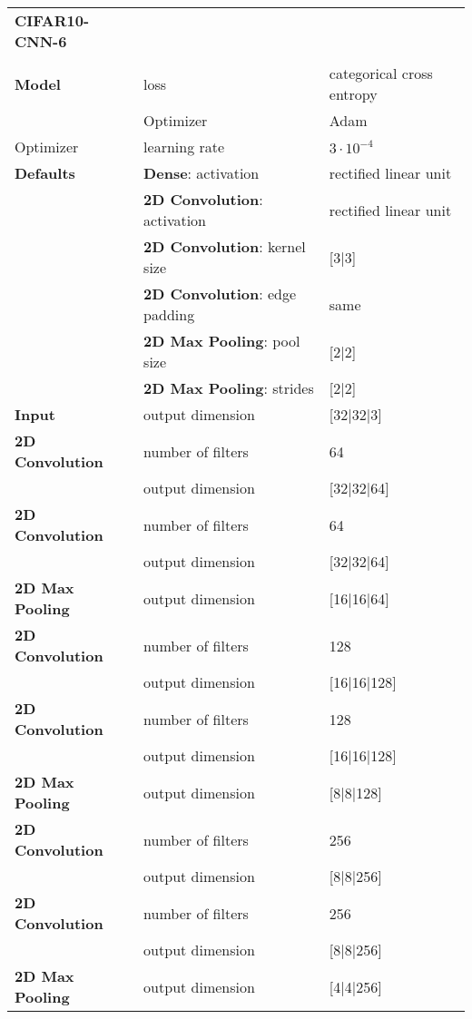 	\begin{tabularx}{\textwidth}[!h]{X X X}
		\multicolumn{1}{X}{\textbf{CIFAR10-CNN-6}}\\
		\\
		\hline
		\endhead
		\textbf{Model} & loss & categorical cross entropy\\
		& Optimizer & Adam\\
		Optimizer & learning rate & $3 \cdot 10^{-4}$\\
		\hline
		\textbf{Defaults} & \textbf{Dense}: activation & rectified linear unit\\
		& \textbf{2D Convolution}: activation & rectified linear unit\\
		& \textbf{2D Convolution}: kernel size & [3|3]\\
		& \textbf{2D Convolution}: edge padding & same\\
		& \textbf{2D Max Pooling}: pool size & [2|2]\\
		& \textbf{2D Max Pooling}: strides & [2|2]\\
		\hline
		\textbf{Input} & output dimension & [32|32|3]\\
		[8pt]
		\textbf{2D Convolution} & number of filters & 64\\
		& output dimension & [32|32|64]\\
		[8pt]
		\textbf{2D Convolution} & number of filters & 64\\
		& output dimension & [32|32|64]\\
		[8pt]
		\textbf{2D Max Pooling} & output dimension & [16|16|64]\\
		[8pt]
		\textbf{2D Convolution} & number of filters & 128\\
		& output dimension & [16|16|128]\\
		[8pt]
		\textbf{2D Convolution} & number of filters & 128\\
		& output dimension & [16|16|128]\\
		[8pt]
		\textbf{2D Max Pooling} & output dimension & [8|8|128]\\
		[8pt]
		\textbf{2D Convolution} & number of filters & 256\\
		& output dimension & [8|8|256]\\
		[8pt]
		\textbf{2D Convolution} & number of filters & 256\\
		& output dimension & [8|8|256]\\
		[8pt]
		\textbf{2D Max Pooling} & output dimension & [4|4|256]\\

\end{tabularx}

